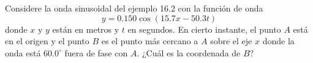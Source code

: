 \item Considere la onda sinusoidal del ejemplo 16.2 con la función de onda
$$ y = 0.150 \cos (15.7x - 50.3t) $$
donde $x$ y $y$ están en metros y $t$ en segundos. En cierto instante, el punto $A$ está en el origen y el punto $B$ es el punto más cercano a $A$ sobre el eje $x$ donde la onda está $60.0^\circ$ fuera de fase con $A$. ¿Cuál es la coordenada de $B$?